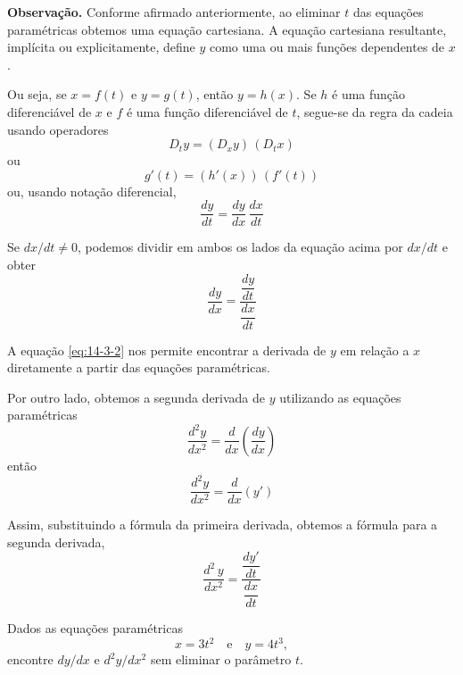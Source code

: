 \bigskip
\noindent\textbf{Observação.}
Conforme afirmado anteriormente, ao eliminar \(t\) das equações paramétricas obtemos uma equação cartesiana. A equação cartesiana resultante, implícita ou explicitamente, define \(y\) como uma ou mais funções dependentes de \(x\).

Ou seja, se \(x = f(t)\) e \(y = g(t)\), então \(y = h(x)\). Se \(h\) é uma função diferenciável de \(x\) e \( f\) é uma função diferenciável de \(t\), segue-se da regra da cadeia usando operadores
\begin{equation*}
D_{t}y = \left(D_{x}y\right)\, \left( D_{t}x\right)
\end{equation*}
ou
\begin{equation*}
g'(t) = (h'(x))\,(f'(t))
\end{equation*}
ou, usando notação diferencial,
\begin{equation*}
\frac{dy}{dt}=\frac{dy}{dx}\,\frac{dx}{dt}
\end{equation*}

Se \(dx/dt \neq 0\), podemos dividir em ambos os lados da equação acima por \(dx/dt\) e obter
\begin{equation}\label{eq:14-3-2}
\frac{dy}{dx}= \dfrac{\dfrac{dy}{dt}}{\dfrac{dx}{dt}}
\end{equation}

A equação \eqref{eq:14-3-2} nos permite encontrar a derivada de \(y\) em relação a \(x\) diretamente a partir das equações paramétricas.

Por outro lado, obtemos a segunda derivada de \(y\) utilizando as equações paramétricas
\begin{equation*}
  \frac{d^{2}y}{dx^{2}}= \frac{d}{dx}\left(\frac{dy}{dx} \right)
\end{equation*}
então
\begin{equation*}
  \frac{d^{2}y}{dx^{2}}=\frac{d}{dx}\left( y'\right)
\end{equation*}

Assim, substituindo a fórmula da primeira derivada, obtemos a fórmula para a segunda derivada,
\begin{equation*}
  \frac{d^{2}\,y}{dx^{2}}= \dfrac{\dfrac{dy'}{dt}}{\dfrac{dx}{dt}}
\end{equation*}

\begin{exc}\label{exer:14-3-3}
Dados as equações paramétricas
\begin{equation*}
x = 3t^{2}\quad \text{e} \quad y = 4t^{3},
\end{equation*}
encontre \(dy/dx\) e \(d^{2}y/dx^{2}\) sem eliminar o parâmetro \( t\).
\end{exc}

